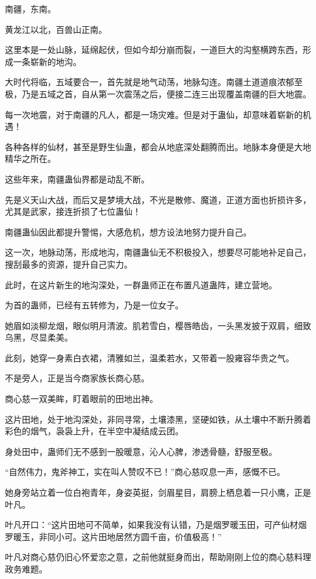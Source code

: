 
\begin{this_body}

南疆，东南。

黄龙江以北，百兽山正南。

这里本是一处山脉，延绵起伏，但如今却分崩而裂，一道巨大的沟壑横跨东西，形成一条崭新的地沟。

大时代将临，五域要合一，首先就是地气动荡，地脉勾连。南疆土道道痕浓郁至极，乃是五域之首，自从第一次震荡之后，便接二连三出现覆盖南疆的巨大地震。

每一次地震，对于南疆的凡人，都是一场灾难。但是对于蛊仙，却意味着崭新的机遇！

各种各样的仙材，甚至是野生仙蛊，都会从地底深处翻腾而出。地脉本身便是大地精华之所在。

这些年来，南疆蛊仙界都是动乱不断。

先是义天山大战，而后又是梦境大战，不光是散修、魔道，正道方面也折损许多，尤其是武家，接连折损了七位蛊仙！

南疆蛊仙因此都提升警惕，大感危机，想方设法地努力提升自己。

这一次，地脉动荡，形成地沟，南疆蛊仙无不积极投入，想要尽可能地补足自己，搜刮最多的资源，提升自己实力。

此时，在这片新生的地沟深处，一群蛊师正在布置凡道蛊阵，建立营地。

为首的蛊师，已经有五转修为，乃是一位女子。

她眉如淡柳龙烟，眼似明月清波。肌若雪白，樱唇皓齿，一头黑发披于双肩，细致乌黑，尽显柔美。

此刻，她穿一身素白衣裙，清雅如兰，温柔若水，又带着一股雍容华贵之气。

不是旁人，正是当今商家族长商心慈。

商心慈一双美眸，盯着眼前的田地出神。

这片田地，处于地沟深处，非同寻常，土壤漆黑，坚硬如铁，从土壤中不断升腾着彩色的烟气，袅袅上升，在半空中凝结成云团。

身处田中，蛊师们无不感到一股暖意，沁人心脾，渗透骨髓，舒服至极。

“自然伟力，鬼斧神工，实在叫人赞叹不已！”商心慈叹息一声，感慨不已。

她身旁站立着一位白袍青年，身姿英挺，剑眉星目，肩膀上栖息着一只小鹰，正是叶凡。

叶凡开口：“这片田地可不简单，如果我没有认错，乃是烟罗暖玉田，可产仙材烟罗暖玉，非同小可。这片田地居然方圆千亩，价值极高！”

叶凡对商心慈仍旧心怀爱恋之意，之前他就挺身而出，帮助刚刚上位的商心慈料理政务难题。


\end{this_body}
